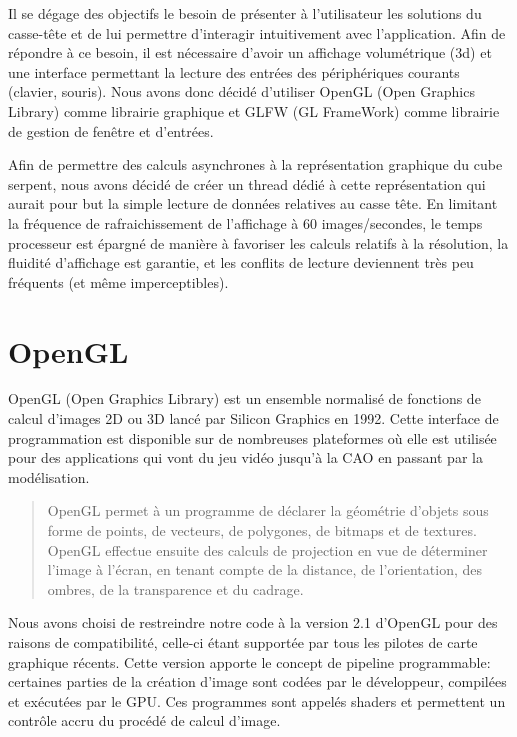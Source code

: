 Il se dégage des objectifs le besoin de présenter à l'utilisateur les solutions du casse-tête et de lui permettre d'interagir intuitivement avec l'application. Afin de répondre à ce besoin, il est nécessaire d'avoir un affichage volumétrique (3d) et une interface permettant la lecture des entrées des périphériques courants (clavier, souris). Nous avons donc décidé d'utiliser OpenGL (Open Graphics Library) comme librairie graphique et GLFW (GL FrameWork) comme librairie de gestion de fenêtre et d'entrées.

Afin de permettre des calculs asynchrones à la représentation graphique du cube serpent, nous avons décidé de créer un thread dédié à cette représentation qui aurait pour but la simple lecture de données relatives au casse tête. En limitant la fréquence de rafraichissement de l'affichage à 60 images/secondes, le temps processeur est épargné de manière à favoriser les calculs relatifs à la résolution,  la fluidité d'affichage est garantie, et les conflits de lecture deviennent très peu fréquents (et même imperceptibles).

\section{OpenGL}

OpenGL (Open Graphics Library) est un ensemble normalisé de fonctions de calcul d'images 2D ou 3D lancé par Silicon Graphics en 1992. Cette interface de programmation est disponible sur de nombreuses plateformes où elle est utilisée pour des applications qui vont du jeu vidéo jusqu'à la CAO en passant par la modélisation.

\begin{quotation}
 OpenGL permet à un programme de déclarer la géométrie d'objets sous forme de points, de vecteurs, de polygones, de bitmaps et de textures. OpenGL effectue ensuite des calculs de projection en vue de déterminer l'image à l'écran, en tenant compte de la distance, de l'orientation, des ombres, de la transparence et du cadrage.
\end{quotation}

Nous avons choisi de restreindre notre code à la version 2.1 d'OpenGL pour des raisons de compatibilité, celle-ci étant supportée par tous les pilotes de carte graphique récents. Cette version apporte le concept de pipeline programmable: certaines parties de la création d'image sont codées par le développeur, compilées et exécutées par le GPU. Ces programmes sont appelés shaders et permettent un contrôle accru du procédé de calcul d'image.


